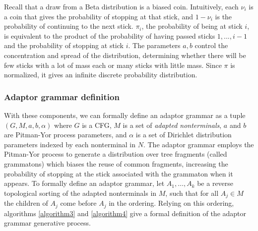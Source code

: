 \documentclass[12pt,letterpaper]{article}
\begin{document}
\noindent Recall that a draw from a Beta distribution is a biased coin. Intuitively, each $\nu_i$ is a coin that gives the probability of stopping at that stick, and $1-\nu_i$ is the probability of continuing to the next stick. $\pi_i$, the probability of being at stick $i$, is equivalent to the product of the probability of having passed sticks $1,...,i-1$ and the probability of stopping at stick $i$. The parameters $a,b$ control the concentration and spread of the distribution, determining whether there will be few sticks with a lot of mass each or many sticks with little mass. Since $\pi$ is normalized, it gives an infinite discrete probability distribution. 

\subsubsection{Adaptor grammar definition}
With these components, we can formally define an adaptor grammar as a tuple $(G, M, a, b, \alpha)$ where $G$ is a CFG, $M$ is a set of \textit{adapted nonterminals}, $a$ and $b$ are Pitman-Yor process parameters, and $\alpha$ is a set of Dirichlet distribution parameters indexed by each nonterminal in $N$. The adaptor grammar employs the Pitman-Yor process to generate a distribution over tree fragments (called grammatons) which biases the reuse of common fragments, increasing the probability of stopping at the stick associated with the grammaton when it appears. To formally define an adaptor grammar, let $A_1,\ldots,A_k$ be a reverse topological sorting of the adapted nonterminals in $M$, such that for all $A_j \in M$ the children of $A_j$ come before $A_j$ in the ordering. Relying on this ordering, algorithms \hyperref[algorithm3]{\ref*{algorithm3}} and \hyperref[algorithm4]{\ref*{algorithm4}} give a formal definition of the adaptor grammar generative process.\\

\end{document}

